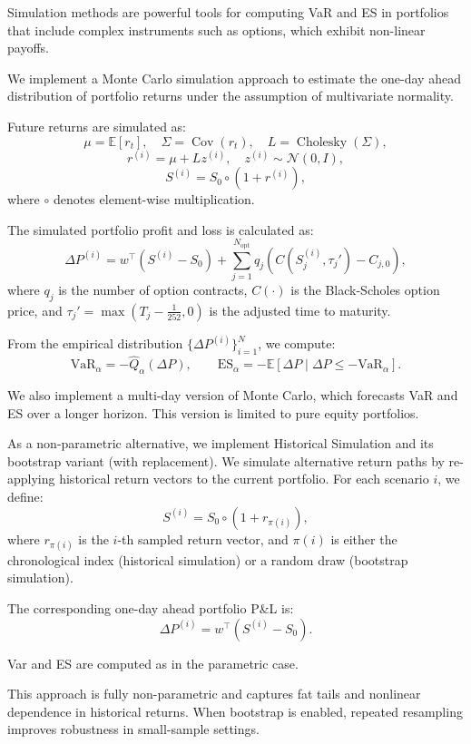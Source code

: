 \documentclass{article}
\begin{document}
Simulation methods are powerful tools for computing VaR and ES in portfolios that include complex instruments such as options, which exhibit non-linear payoffs.

We implement a Monte Carlo simulation approach to estimate the one-day ahead distribution of portfolio returns under the assumption of multivariate normality. 

Future returns are simulated as:
\[
\mu = \mathbb{E}[r_t], \quad \Sigma = \operatorname{Cov}(r_t), \quad L = \operatorname{Cholesky}(\Sigma),
\]
\[
r^{(i)} = \mu + L z^{(i)}, \quad z^{(i)} \sim \mathcal{N}(0, I),
\]
\[
S^{(i)} = S_0 \circ (1 + r^{(i)}),
\]
where \( \circ \) denotes element-wise multiplication.

The simulated portfolio profit and loss is calculated as:
\[
\Delta P^{(i)} = w^\top(S^{(i)} - S_0) + \sum_{j=1}^{N_{\mathrm{opt}}} q_j \left(C(S_j^{(i)}, \tau_j') - C_{j,0}\right),
\]
where \( q_j \) is the number of option contracts, \( C(\cdot) \) is the Black-Scholes option price, and \( \tau_j' = \max(T_j - \tfrac{1}{252}, 0) \) is the adjusted time to maturity.

From the empirical distribution \( \{\Delta P^{(i)}\}_{i=1}^N \), we compute:
\[
\text{VaR}_\alpha = -\widehat{Q}_\alpha(\Delta P), \qquad
\text{ES}_\alpha = -\mathbb{E}[\Delta P \mid \Delta P \le -\text{VaR}_\alpha].
\]

We also implement a multi-day version of Monte Carlo, which forecasts VaR and ES over a longer horizon. This version is limited to pure equity portfolios.

As a non-parametric alternative, we implement Historical Simulation and its bootstrap variant (with replacement). We simulate alternative return paths by re-applying historical return vectors to the current portfolio. For each scenario \( i \), we define:
\[
S^{(i)} = S_0 \circ (1 + r_{\pi(i)}),
\]
where \( r_{\pi(i)} \) is the \( i \)-th sampled return vector, and \( \pi(i) \) is either the chronological index (historical simulation) or a random draw (bootstrap simulation).

The corresponding one-day ahead portfolio P\&L is:
\[
\Delta P^{(i)} = w^\top (S^{(i)} - S_0).
\]

Var and ES are computed as in the parametric case.

This approach is fully non-parametric and captures fat tails and nonlinear dependence in historical returns. When bootstrap is enabled, repeated resampling improves robustness in small-sample settings.
\end{document}
